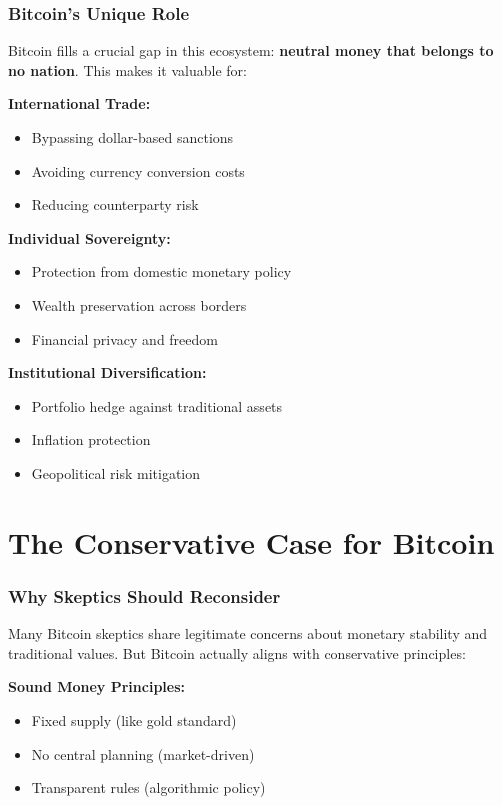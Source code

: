 \documentclass[11pt,oneside]{book}
\begin{document}
\subsubsection{Bitcoin's Unique Role}

Bitcoin fills a crucial gap in this ecosystem: \textbf{neutral money that belongs to no nation}. This makes it valuable for:

\textbf{International Trade:}
\begin{itemize}
\item Bypassing dollar-based sanctions
\item Avoiding currency conversion costs
\item Reducing counterparty risk
\end{itemize}

\textbf{Individual Sovereignty:}
\begin{itemize}
\item Protection from domestic monetary policy
\item Wealth preservation across borders
\item Financial privacy and freedom
\end{itemize}

\textbf{Institutional Diversification:}
\begin{itemize}
\item Portfolio hedge against traditional assets
\item Inflation protection
\item Geopolitical risk mitigation
\end{itemize}

\section{The Conservative Case for Bitcoin}

\subsubsection{Why Skeptics Should Reconsider}

Many Bitcoin skeptics share legitimate concerns about monetary stability and traditional values. But Bitcoin actually aligns with conservative principles:

\textbf{Sound Money Principles:}
\begin{itemize}
\item Fixed supply (like gold standard)
\item No central planning (market-driven)
\item Transparent rules (algorithmic policy)
\end{itemize}
\end{document}
